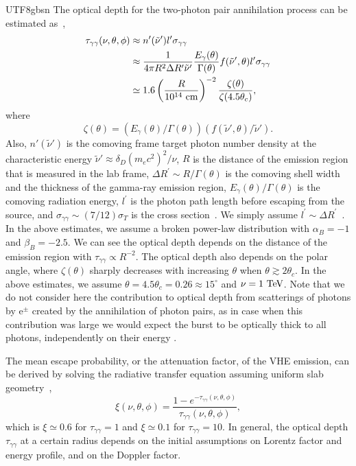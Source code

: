 \documentclass[fleqn,usenatbib]{mnras}
\begin{document}
\begin{CJK*}{UTF8}{gbsn}
The optical depth for the two-photon pair annihilation process can be estimated as~\citep[e.g.,][]{Murase:2015xka},
\begin{align}\label{eq:tau}
    \tau_{\gamma\gamma} (\nu, \theta, \phi) &\approx n'(\tilde{\nu}') l^\prime \sigma_ {\gamma\gamma} \nonumber \\ &\approx  \frac{1} {4\pi R^2 \Delta R^\prime  \tilde{\nu}'} \frac{E_{\gamma} (\theta)}{\Gamma(\theta)} f(\tilde{\nu}', \theta)
  l^\prime \sigma_ {\gamma\gamma}
    \nonumber \\ &\simeq 1.6 \left(\frac{R}{10^{14}\rm~cm}\right)^{-2} \frac{\zeta(\theta)}{\zeta(4.5 \theta_c)},
\end{align}
where 
\begin{equation}\label{eq:zeta}
    \zeta(\theta) = (E_{\gamma} (\theta)/\Gamma(\theta))( f(\tilde{\nu}', \theta) / \tilde{\nu}').
\end{equation}
Also, $n'(\tilde{\nu}')$ is the comoving frame target photon number density at the characteristic energy $\tilde{\nu}' \approx \delta_D (m_e c^2)^2 / \nu$, $R$ is the distance of the emission region that is measured in the lab frame, $\Delta R^\prime \sim R /\Gamma(\theta)$ is the comoving shell width and the thickness of the gamma-ray emission region, $E_{\gamma} (\theta)/\Gamma(\theta)$ is the comoving radiation energy, $l^\prime$ is the photon path length before escaping from the source, and $\sigma_ {\gamma\gamma} \sim (7/12) \sigma_T$ is the cross section~\citep[e.g.,][]{1987MNRAS.227..403S}.
We simply assume $l^\prime \sim \Delta R^\prime$~\citep{matsumotoB}.
In the above estimates, we assume a broken power-law distribution with $\alpha_B = -1$ and $\beta_B = -2.5$.
We can see the optical depth depends on the distance of the emission region with $\tau_{\gamma \gamma} \propto R^{-2}$. 
The optical depth also depends on the polar angle, where $\zeta(\theta)$ sharply decreases with increasing $\theta$ when $\theta \gtrsim 2 \theta_c$.
In the above estimates, we assume $\theta = 4.5 \theta_c = 0.26 \approx 15^\circ$ and $\nu = 1\rm~TeV$. 
Note that we do not consider here the contribution to optical depth from scatterings of photons by e$^{\pm}$ created by the annihilation of photon pairs, as in case when this contribution was large we would expect the burst to be optically thick to all photons, independently on their energy \citep{lithwick01}.  


The mean escape probability, or the attenuation factor, of the VHE emission, can be derived by solving the radiative transfer equation assuming uniform slab geometry~\citep{1987MNRAS.227..403S},
\begin{equation}
    \xi (\nu, \theta, \phi)= \frac{1 - e^{-\tau_{\gamma\gamma}(\nu, \theta, \phi)}}{\tau_{\gamma\gamma}(\nu, \theta, \phi)},
\end{equation}
which is $\xi \simeq 0.6$ for $\tau_{\gamma\gamma} = 1$ and $\xi \simeq 0.1$ for $\tau_{\gamma\gamma} = 10$.  In general, the optical depth $\tau_{\gamma\gamma}$ at a certain radius depends on the initial assumptions on Lorentz factor and energy profile, and on the Doppler factor.



\end{CJK*}
\end{document}
